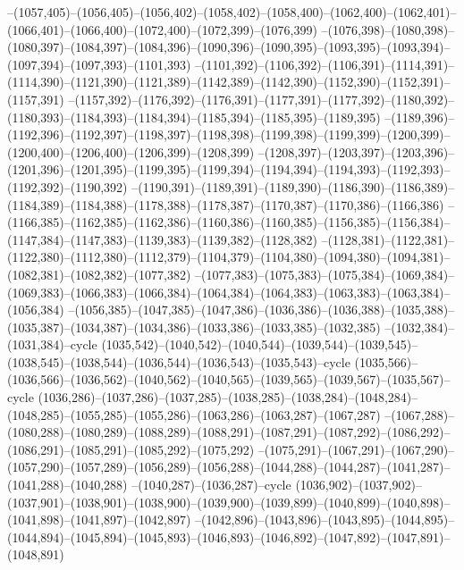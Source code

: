 --(1057,405)--(1056,405)--(1056,402)--(1058,402)--(1058,400)--(1062,400)--(1062,401)--(1066,401)--(1066,400)--(1072,400)--(1072,399)--(1076,399)
--(1076,398)--(1080,398)--(1080,397)--(1084,397)--(1084,396)--(1090,396)--(1090,395)--(1093,395)--(1093,394)--(1097,394)--(1097,393)--(1101,393)
--(1101,392)--(1106,392)--(1106,391)--(1114,391)--(1114,390)--(1121,390)--(1121,389)--(1142,389)--(1142,390)--(1152,390)--(1152,391)--(1157,391)
--(1157,392)--(1176,392)--(1176,391)--(1177,391)--(1177,392)--(1180,392)--(1180,393)--(1184,393)--(1184,394)--(1185,394)--(1185,395)--(1189,395)
--(1189,396)--(1192,396)--(1192,397)--(1198,397)--(1198,398)--(1199,398)--(1199,399)--(1200,399)--(1200,400)--(1206,400)--(1206,399)--(1208,399)
--(1208,397)--(1203,397)--(1203,396)--(1201,396)--(1201,395)--(1199,395)--(1199,394)--(1194,394)--(1194,393)--(1192,393)--(1192,392)--(1190,392)
--(1190,391)--(1189,391)--(1189,390)--(1186,390)--(1186,389)--(1184,389)--(1184,388)--(1178,388)--(1178,387)--(1170,387)--(1170,386)--(1166,386)
--(1166,385)--(1162,385)--(1162,386)--(1160,386)--(1160,385)--(1156,385)--(1156,384)--(1147,384)--(1147,383)--(1139,383)--(1139,382)--(1128,382)
--(1128,381)--(1122,381)--(1122,380)--(1112,380)--(1112,379)--(1104,379)--(1104,380)--(1094,380)--(1094,381)--(1082,381)--(1082,382)--(1077,382)
--(1077,383)--(1075,383)--(1075,384)--(1069,384)--(1069,383)--(1066,383)--(1066,384)--(1064,384)--(1064,383)--(1063,383)--(1063,384)--(1056,384)
--(1056,385)--(1047,385)--(1047,386)--(1036,386)--(1036,388)--(1035,388)--(1035,387)--(1034,387)--(1034,386)--(1033,386)--(1033,385)--(1032,385)
--(1032,384)--(1031,384)--cycle
(1035,542)--(1040,542)--(1040,544)--(1039,544)--(1039,545)--(1038,545)--(1038,544)--(1036,544)--(1036,543)--(1035,543)--cycle
(1035,566)--(1036,566)--(1036,562)--(1040,562)--(1040,565)--(1039,565)--(1039,567)--(1035,567)--cycle
(1036,286)--(1037,286)--(1037,285)--(1038,285)--(1038,284)--(1048,284)--(1048,285)--(1055,285)--(1055,286)--(1063,286)--(1063,287)--(1067,287)
--(1067,288)--(1080,288)--(1080,289)--(1088,289)--(1088,291)--(1087,291)--(1087,292)--(1086,292)--(1086,291)--(1085,291)--(1085,292)--(1075,292)
--(1075,291)--(1067,291)--(1067,290)--(1057,290)--(1057,289)--(1056,289)--(1056,288)--(1044,288)--(1044,287)--(1041,287)--(1041,288)--(1040,288)
--(1040,287)--(1036,287)--cycle
(1036,902)--(1037,902)--(1037,901)--(1038,901)--(1038,900)--(1039,900)--(1039,899)--(1040,899)--(1040,898)--(1041,898)--(1041,897)--(1042,897)
--(1042,896)--(1043,896)--(1043,895)--(1044,895)--(1044,894)--(1045,894)--(1045,893)--(1046,893)--(1046,892)--(1047,892)--(1047,891)--(1048,891)

